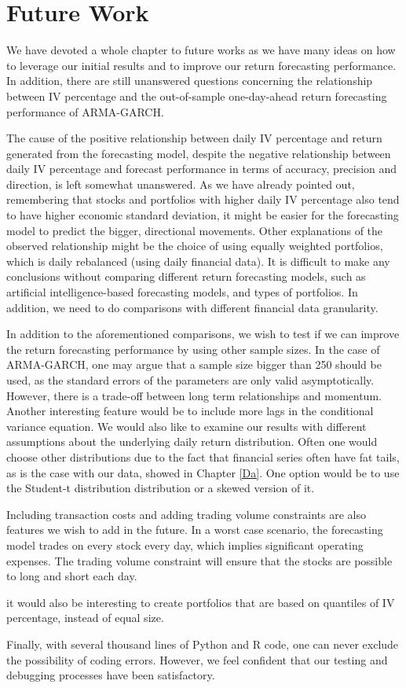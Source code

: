 \chapter{Future Work} \label{FutureWork}
\label{FW}
We have devoted a whole chapter to future works as we have many ideas on how to leverage our initial results and to improve our return forecasting performance. In addition, there are still unanswered questions concerning the relationship between IV percentage and the out-of-sample one-day-ahead return forecasting performance of ARMA-GARCH.

The cause of the positive relationship between daily IV percentage and return generated from the forecasting model, despite the negative relationship between daily IV percentage and forecast performance in terms of accuracy, precision and direction, is left somewhat unanswered. As we have already pointed out, remembering that stocks and portfolios with higher daily IV percentage also tend to have higher economic standard deviation, it might be easier for the forecasting model to predict the bigger, directional movements. Other explanations of the observed relationship might be the choice of using equally weighted portfolios, which is daily rebalanced (using daily financial data). It is difficult to make any conclusions without comparing different return forecasting models, such as artificial intelligence-based forecasting models, and types of portfolios. In addition, we need to do comparisons with different financial data granularity. 

In addition to the aforementioned comparisons, we wish to test if we can improve the return forecasting performance by using other sample sizes. In the case of ARMA-GARCH, one may argue that a sample size bigger than 250 should be used, as the standard errors of the parameters are only valid asymptotically. However, there is a trade-off between long term relationships and momentum. Another interesting feature would be to include more lags in the conditional variance equation. We would also like to examine our results with different assumptions about the underlying daily return distribution. Often one would choose other distributions due to the fact that financial series often have fat tails, as is the case with our data, showed in Chapter \ref{Da}. One option would be to use the Student-t distribution distribution or a skewed version of it.

Including transaction costs and adding trading volume constraints are also features we wish to add in the future. In a worst case scenario, the forecasting model trades on every stock every day, which implies significant operating expenses. The trading volume constraint will ensure that the stocks are possible to long and short each day. 

it would also be interesting to create portfolios that are based on quantiles of IV percentage, instead of equal size. 

Finally, with several thousand lines of Python and R code, one can never exclude the possibility of coding errors. However, we feel confident that our testing and debugging processes have been satisfactory. 